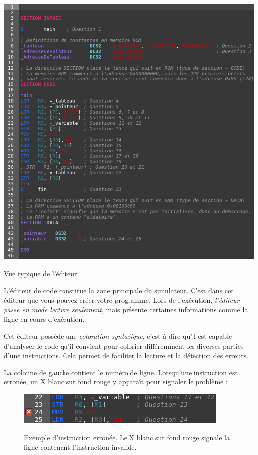 \documentclass{tufte-handout}
\begin{document}
\begin{marginfigure}
\includegraphics[width=\linewidth]{pics/editeur.png}
\label{f:editeur}
\caption{Vue typique de l'éditeur}
\end{marginfigure}
L'éditeur de code constitue la zone principale du simulateur. C'est dans cet éditeur que vous pouvez créer votre programme. Lors de l'exécution, \emph{l'éditeur passe en mode lecture seulement}, mais présente certaines informations comme la ligne en cours d'exécution.

Cet éditeur possède une \emph{coloration syntaxique}, c'est-à-dire qu'il est capable d'analyser le code qu'il convient pour colorier différemment les diverses parties d'une instructions. Cela permet de faciliter la lecture et la détection des erreurs. 

La colonne de gauche contient le numéro de ligne. Lorsqu'une instruction est erronée, un X blanc sur fond rouge y apparaît pour signaler le problème :
\begin{figure}[h!]
\raggedleft
\includegraphics[width=0.9\linewidth]{pics/editeur_err.png}
\label{f:editeurerror}
\caption{Exemple d'instruction erronée. Le X blanc sur fond rouge signale la ligne contenant l'instruction invalide.}
\end{figure}
\end{document}
